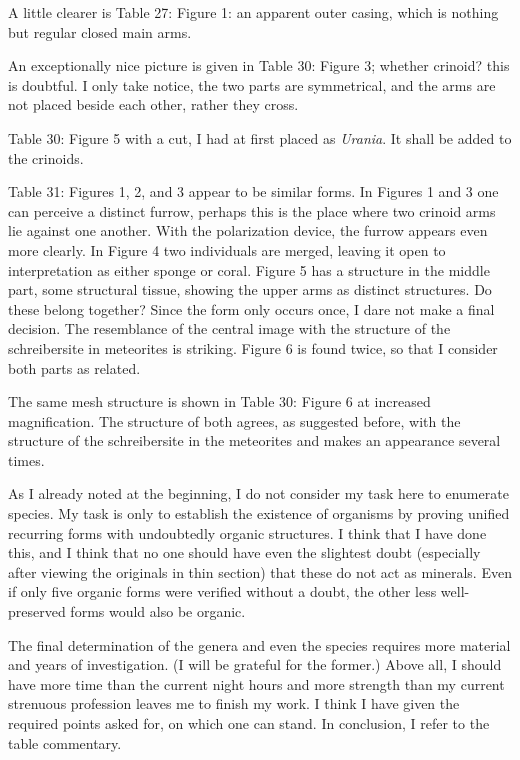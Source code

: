 \documentclass[a4paper, 12pt, oneside]{article}
\begin{document}
A little clearer is Table 27: Figure 1: an apparent outer casing, which is nothing but regular closed main arms.

An exceptionally nice picture is given in Table 30: Figure 3; whether crinoid? this is doubtful. I only take notice, the two parts are symmetrical, and the arms are not placed beside each other, rather they cross.

Table 30: Figure 5 with a cut, I had at first placed as \emph{Urania}. It shall be added to the crinoids.

Table 31: Figures 1, 2, and 3 appear to be similar forms. In Figures 1 and 3 one can perceive a distinct furrow, perhaps this is the place where two crinoid arms lie against one another. With the polarization device, the furrow appears even more clearly. In Figure 4 two individuals are merged, leaving it open to interpretation as either sponge or coral. Figure 5 has a structure in the middle part, some structural tissue, showing the upper arms as distinct structures. Do these belong together? Since the form only occurs once, I dare not make a final decision. The resemblance of the central image with the structure of the schreibersite in meteorites is striking. Figure 6 is found twice, so that I consider both parts as related.

The same mesh structure is shown in Table 30: Figure 6 at increased magnification. The structure of both agrees, as suggested before, with the structure of the schreibersite in the meteorites and makes an appearance several times.

As I already noted at the beginning, I do not consider my task here to enumerate species. My task is only to establish the existence of organisms by proving unified recurring forms with undoubtedly organic structures. I think that I have done this, and I think that no one should have even the slightest doubt (especially after viewing the originals in thin section) that these do not act as minerals. Even if only five organic forms were verified without a doubt, the other less well-preserved forms would also be organic.

The final determination of the genera and even the species requires more material and years of investigation. (I will be grateful for the former.) Above all, I should have more time than the current night hours and more strength than my current strenuous profession leaves me to finish my work. I think I have given the required points asked for, on which one can stand. In conclusion, I refer to the table commentary.
\end{document}
